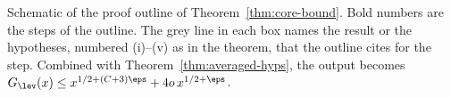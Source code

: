 \ifdim\wd0>\linewidth\resizebox{\linewidth}{!}{\box0}%
\else\leavevmode\box0\fi
\caption{Schematic of the proof outline of Theorem~\ref{thm:core-bound}.
Bold numbers are the steps of the outline. The grey line in each box
names the result or the hypotheses, numbered (i)--(v) as in the theorem,
that the outline cites for the step. Combined with Theorem~\ref{thm:averaged-hyps}, the
output becomes $G_\lev(x)\le x^{1/2+(C+3)\eps}+4o\,x^{1/2+\eps}$.}
\label{fig:core-steps}
